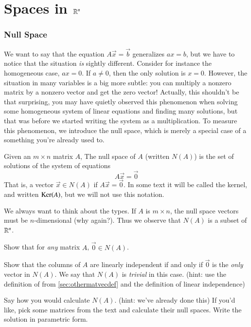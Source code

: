 \part{Spaces in $\mathbb{R}^n$}
\newpage
 
\section{Null Space}

We want to say that the equation $A\vec{x}=\vec{b}$ generalizes $ax=b$, but we have to notice that the situation \emph{is} sightly different.  
Consider for instance the homogeneous case, $ax=0$.  If $a\ne 0$, then the only solution is $x=0$.
However, the situation in many variables is a big more subtle: you can multiply a nonzero matrix by a nonzero vector and get the zero vector!
Actually, this shouldn't be that surprising, you may have quietly observed this phenomenon when solving some homogeneous system of linear equations and finding many solutions, but that was before we started writing the system as a multiplication.  
To measure this phenomenon, we introduce the null space, which is merely a special case of a something you're already used to.
\begin{Def}
  Given an $m\times n$ matrix $A$, The null space of $A$ (written $N(A)$) is the set of solutions of the system of equations 
  \[A\vec{x}=\vec{0}\]
  That is, a vector $\vec{x}\in N(A)$ if $A\vec{x}=\vec{0}$.
  In some text it will be called the kernel, and written $\operatorname{Ker}\nolimits(A)$, but we will not use this notation.  
\end{Def}
\begin{Remark}
  We always want to think about the types.  If $A$ is $m\times n$, the null space vectors must be $n$-dimensional (why again?).  
  Thus we observe that $N(A)$ is a subset of $\mathbb{R}^n$.
\end{Remark}
\begin{EasyEx}
  Show that for \emph{any} matrix $A$, $\vec{0}\in N(A)$.  
\end{EasyEx}
\begin{Ex}
  Show that the columns of $A$ are linearly independent if and only if $\vec{0}$ is the \emph{only} vector in $N(A)$.
  We say that $N(A)$ is \emph{trivial} in this case.  
  (hint: use the definition of from \ref{sec:othermatvecdef} and the definition of linear independence)
\end{Ex}
\begin{EasyEx}
  Say how you would calculate $N(A)$.  (hint: we've already done this)
  If you'd like, pick some matrices from the text and calculate their null spaces.  
  Write the solution in parametric form.  
\end{EasyEx}

